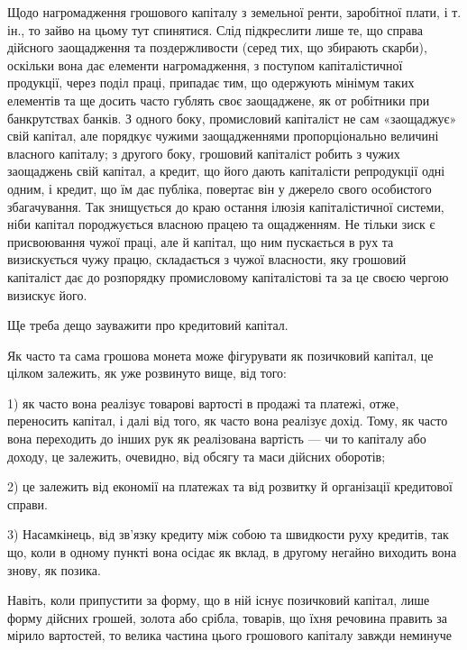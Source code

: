 Щодо нагромадження грошового капіталу з земельної ренти, заробітної плати,
і т. ін., то зайво на цьому тут спинятися. Слід підкреслити лише те, що справа
дійсного заощадження та поздержливости (серед тих, що збирають скарби), оскільки
вона дає елементи нагромадження, з поступом капіталістичної продукції, через поділ
праці, припадає тим, що одержують мінімум таких елементів та ще досить часто
гублять своє заощаджене, як от робітники при банкрутствах банків. З одного
боку, промисловий капіталіст не сам «заощаджує» свій капітал, але порядкує чужими
заощадженнями пропорціонально величині власного капіталу; з другого боку,
грошовий капіталіст робить з чужих заощаджень свій капітал, а кредит, що його
дають капіталісти репродукції одні одним, і кредит, що їм дає публіка, повертає
він у джерело свого особистого збагачування. Так знищується до краю остання
ілюзія капіталістичної системи, ніби капітал породжується власною працею та ощадженням.
Не тільки зиск є присвоювання чужої праці, але й капітал, що ним
пускається в рух та визискується чужу працю, складається з чужої власности,
яку грошовий капіталіст дає до розпорядку промисловому капіталістові та за
це своєю чергою визискує його.

Ще треба дещо зауважити про кредитовий капітал.

Як часто та сама грошова монета може фігурувати як позичковий капітал,
це цілком залежить, як уже розвинуто вище, від того:

1) як часто вона реалізує товарові вартості в продажі та платежі, отже,
переносить капітал, і далі від того, як часто вона реалізує дохід. Тому, як
часто вона переходить до інших рук як реалізована вартість — чи то капіталу
або доходу, це залежить, очевидно, від обсягу та маси дійсних оборотів;

2) це залежить від економії на платежах та від розвитку й організації
кредитової справи.

3) Насамкінець, від зв’язку кредиту між собою та швидкости руху кредитів,
так що, коли в одному пункті вона осідає як вклад, в другому негайно
виходить вона знову, як позика.

Навіть, коли припустити за форму, що в ній існує позичковий капітал, лише
форму дійсних грошей, золота або срібла, товарів, що їхня речовина править за
мірило вартостей, то велика частина цього грошового капіталу завжди неминуче
\parbreak{}  %
